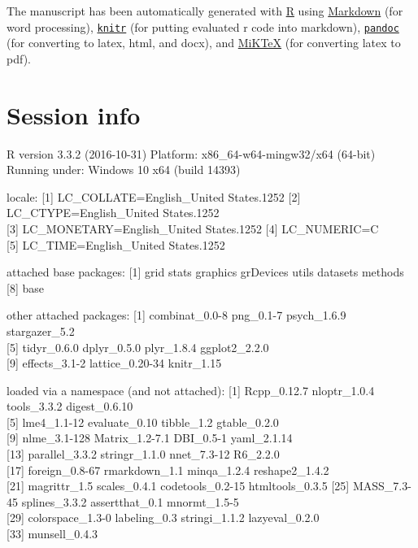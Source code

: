 \documentclass[,]{article}
\begin{document}
The manuscript has been automatically generated with
\href{http://r-project.org/}{R} using
\href{http://daringfireball.net/projects/markdown/}{Markdown} (for word
processing), \href{http://yihui.name/knitr/}{\texttt{knitr}} (for
putting evaluated r code into markdown),
\href{http://johnmacfarlane.net/pandoc/}{\texttt{pandoc}} (for
converting to latex, html, and docx), and
\href{http://miktex.org/}{MiKTeX} (for converting latex to pdf).

\newpage

\section{Session info}\label{session-info}

R version 3.3.2 (2016-10-31) Platform: x86\_64-w64-mingw32/x64 (64-bit)
Running under: Windows 10 x64 (build 14393)

locale: {[}1{]} LC\_COLLATE=English\_United States.1252 {[}2{]}
LC\_CTYPE=English\_United States.1252\\
{[}3{]} LC\_MONETARY=English\_United States.1252 {[}4{]} LC\_NUMERIC=C\\
{[}5{]} LC\_TIME=English\_United States.1252

attached base packages: {[}1{]} grid stats graphics grDevices utils
datasets methods\\
{[}8{]} base

other attached packages: {[}1{]} combinat\_0.0-8 png\_0.1-7 psych\_1.6.9
stargazer\_5.2\\
{[}5{]} tidyr\_0.6.0 dplyr\_0.5.0 plyr\_1.8.4 ggplot2\_2.2.0\\
{[}9{]} effects\_3.1-2 lattice\_0.20-34 knitr\_1.15

loaded via a namespace (and not attached): {[}1{]} Rcpp\_0.12.7
nloptr\_1.0.4 tools\_3.3.2 digest\_0.6.10\\
{[}5{]} lme4\_1.1-12 evaluate\_0.10 tibble\_1.2 gtable\_0.2.0\\
{[}9{]} nlme\_3.1-128 Matrix\_1.2-7.1 DBI\_0.5-1 yaml\_2.1.14\\
{[}13{]} parallel\_3.3.2 stringr\_1.1.0 nnet\_7.3-12 R6\_2.2.0\\
{[}17{]} foreign\_0.8-67 rmarkdown\_1.1 minqa\_1.2.4 reshape2\_1.4.2\\
{[}21{]} magrittr\_1.5 scales\_0.4.1 codetools\_0.2-15 htmltools\_0.3.5
{[}25{]} MASS\_7.3-45 splines\_3.3.2 assertthat\_0.1 mnormt\_1.5-5\\
{[}29{]} colorspace\_1.3-0 labeling\_0.3 stringi\_1.1.2
lazyeval\_0.2.0\\
{[}33{]} munsell\_0.4.3
\end{document}
